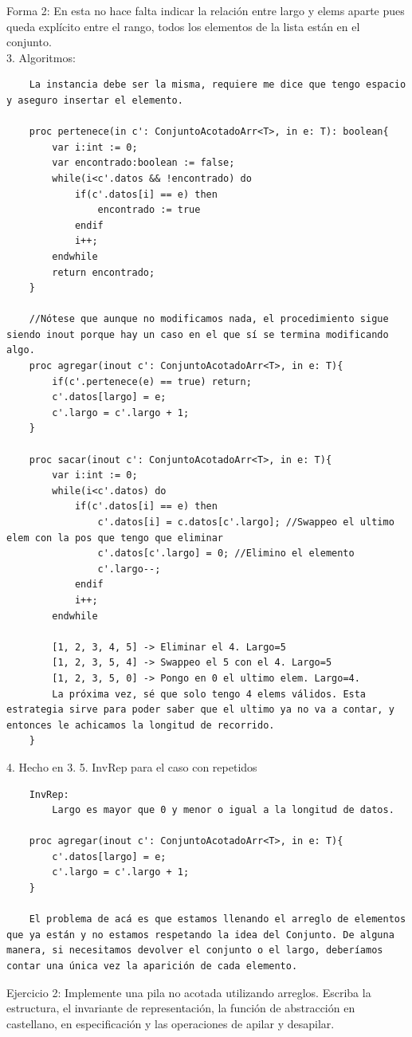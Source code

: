 \documentclass[10pt,a4paper]{article}
\begin{document}
Forma 2: En esta no hace falta indicar la relación entre largo y elems aparte pues queda explícito entre el rango, todos los elementos de la lista están en el conjunto. \\
3. Algoritmos: 
\begin{lstlisting}
    La instancia debe ser la misma, requiere me dice que tengo espacio y aseguro insertar el elemento.

    proc pertenece(in c': ConjuntoAcotadoArr<T>, in e: T): boolean{
        var i:int := 0;
        var encontrado:boolean := false;
        while(i<c'.datos && !encontrado) do
            if(c'.datos[i] == e) then
                encontrado := true
            endif
            i++;
        endwhile
        return encontrado; 
    }
    
    //Nótese que aunque no modificamos nada, el procedimiento sigue siendo inout porque hay un caso en el que sí se termina modificando algo.
    proc agregar(inout c': ConjuntoAcotadoArr<T>, in e: T){
        if(c'.pertenece(e) == true) return; 
        c'.datos[largo] = e;
        c'.largo = c'.largo + 1; 
    }

    proc sacar(inout c': ConjuntoAcotadoArr<T>, in e: T){
        var i:int := 0;
        while(i<c'.datos) do
            if(c'.datos[i] == e) then
                c'.datos[i] = c.datos[c'.largo]; //Swappeo el ultimo elem con la pos que tengo que eliminar
                c'.datos[c'.largo] = 0; //Elimino el elemento
                c'.largo--;
            endif 
            i++;
        endwhile 

        [1, 2, 3, 4, 5] -> Eliminar el 4. Largo=5
        [1, 2, 3, 5, 4] -> Swappeo el 5 con el 4. Largo=5
        [1, 2, 3, 5, 0] -> Pongo en 0 el ultimo elem. Largo=4.
        La próxima vez, sé que solo tengo 4 elems válidos. Esta estrategia sirve para poder saber que el ultimo ya no va a contar, y entonces le achicamos la longitud de recorrido.
    }
\end{lstlisting}
4. Hecho en 3.
5. InvRep para el caso con repetidos 
\begin{lstlisting}
    InvRep:
        Largo es mayor que 0 y menor o igual a la longitud de datos.
        
    proc agregar(inout c': ConjuntoAcotadoArr<T>, in e: T){
        c'.datos[largo] = e;
        c'.largo = c'.largo + 1; 
    }

    El problema de acá es que estamos llenando el arreglo de elementos que ya están y no estamos respetando la idea del Conjunto. De alguna manera, si necesitamos devolver el conjunto o el largo, deberíamos contar una única vez la aparición de cada elemento.

\end{lstlisting}
Ejercicio 2: Implemente una pila no acotada utilizando arreglos. Escriba la estructura, el invariante de representación, la función de abstracción en castellano, en especificación y las operaciones de apilar y desapilar. \\
\end{document}
